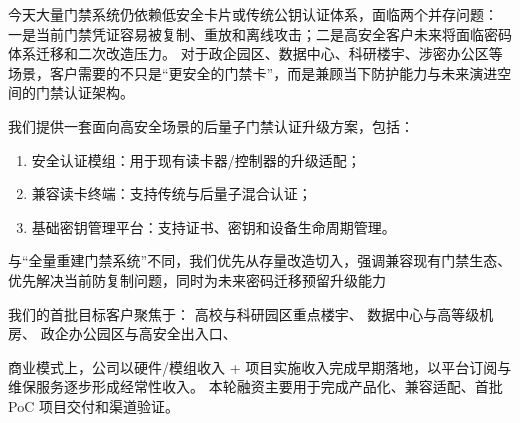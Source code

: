 {\xiaosi\songti
	
今天大量门禁系统仍依赖低安全卡片或传统公钥认证体系，面临两个并存问题：
一是当前门禁凭证容易被复制、重放和离线攻击；二是高安全客户未来将面临密码体系迁移和二次改造压力。
对于政企园区、数据中心、科研楼宇、涉密办公区等场景，客户需要的不只是“更安全的门禁卡”，而是兼顾当下防护能力与未来演进空间的门禁认证架构。

我们提供一套面向高安全场景的后量子门禁认证升级方案，包括：

\begin{enumerate}
	\item 安全认证模组：用于现有读卡器/控制器的升级适配；
	\item 兼容读卡终端：支持传统与后量子混合认证；
	\item 基础密钥管理平台：支持证书、密钥和设备生命周期管理。
\end{enumerate}


与“全量重建门禁系统”不同，我们优先从存量改造切入，强调兼容现有门禁生态、优先解决当前防复制问题，同时为未来密码迁移预留升级能力

我们的首批目标客户聚焦于：
高校与科研园区重点楼宇、
数据中心与高等级机房、
政企办公园区与高安全出入口、

商业模式上，公司以硬件/模组收入 + 项目实施收入完成早期落地，以平台订阅与维保服务逐步形成经常性收入。
本轮融资主要用于完成产品化、兼容适配、首批 PoC 项目交付和渠道验证。

	
	\vspace{2em}
	
}